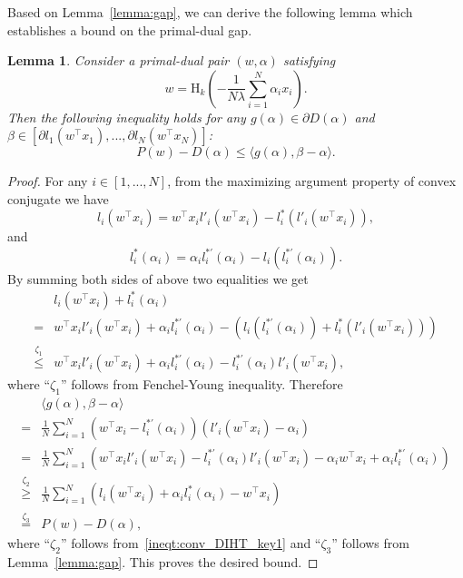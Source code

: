 \documentclass[11pt]{article}
\newtheorem{lemma}{Lemma}
\numberwithin{equation}{section}
\numberwithin{table}{section}
\numberwithin{figure}{section}
\begin{document}
Based on Lemma~\ref{lemma:gap}, we can derive the following lemma which establishes a bound on the primal-dual gap.
\begin{lemma}\label{lemma:gap_bound}
Consider a primal-dual pair $(w,\alpha)$ satisfying
\[
w = \mathrm{H}_k\left(-\frac{1}{N\lambda} \sum_{i=1}^N \alpha_i x_i \right).
\]
Then the following inequality holds for any $g(\alpha)\in \partial D(\alpha)$ and $\beta \in [\partial l_1(w^\top x_1),...,\partial l_N(w^\top x_N)]$:
\[
P(w) - D(\alpha) \le \langle g(\alpha), \beta - \alpha\rangle.
\]
\end{lemma}
\begin{proof}
For any $i \in [1,...,N]$, from the maximizing argument property of convex conjugate we have
\[
l_i(w^\top x_i) = w^\top x_i l'_i(w^\top x_i) - l^*_i(l'_i(w^\top x_i)),
\]
and
\[
l^*_i(\alpha_i) = \alpha_i l^{*'}_i(\alpha_i) - l_i( l^{*'}_i(\alpha_i)).
\]
By summing both sides of above two equalities we get
\begin{equation}\label{ineqt:conv_DIHT_key1}
\begin{aligned}
&l_i(w^\top x_i) + l^*_i(\alpha_i) \\
 =& w^\top x_i l'_i(w^\top x_i) + \alpha_i l^{*'}_i(\alpha_i) -(l_i(l^{*'}_i(\alpha_i)) + l^*_i(l'_i(w^\top x_i))) \\
\overset{\zeta_1}{\le}& w^\top x_i l'_i(w^\top x_i) + \alpha_i l^{*'}_i(\alpha_i) - l^{*'}_i(\alpha_i) l'_i(w^\top x_i),
\end{aligned}
\end{equation}
where ``$\zeta_1$'' follows from Fenchel-Young inequality. Therefore
\[
\begin{aligned}
&\langle g(\alpha), \beta - \alpha\rangle  \\
 =& \frac{1}{N}\sum_{i=1}^N (w^\top x_i - l^{*'}_i(\alpha_i))(l'_i(w^\top x_i)-\alpha_i)  \\
 =& \frac{1}{N}\sum_{i=1}^N \left( w^\top x_i l'_i(w^\top x_i) - l^{*'}_i(\alpha_i) l'_i(w^\top x_i) -\alpha_i w^\top x_i + \alpha_i l^{*'}_i(\alpha_i)\right) \\
 \overset{\zeta_2}{\ge}& \frac{1}{N}\sum_{i=1}^N (l_i(w^\top x_i) + \alpha_i l^*_i(\alpha_i) -w^\top x_i ) \\
 \overset{\zeta_3}{=}& P(w) - D(\alpha),
\end{aligned}
\]
where ``$\zeta_2$'' follows from~\eqref{ineqt:conv_DIHT_key1} and ``$\zeta_3$'' follows from Lemma~\ref{lemma:gap}. This proves the desired bound.
\end{proof}
\end{document}
